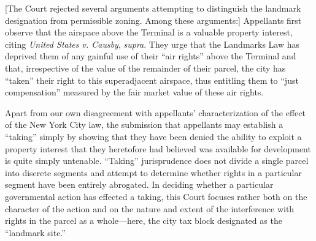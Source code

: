 
[The Court rejected several arguments attempting to distinguish the landmark
designation from permissible zoning. Among these arguments:]
Appellants
first observe that the airspace above the Terminal is a valuable property
interest, citing \textit{United States v. Causby}, \emph{supra}. They urge that
the Landmarks Law has deprived them of any gainful use of their ``air rights''
above the Terminal and that, irrespective of the value of the remainder of their
parcel, the city has ``taken'' their right to this superadjacent airspace, thus
entitling them to ``just compensation'' measured by the fair market value of
these air rights.

Apart from our own disagreement with appellants' characterization of the effect
of the New York City law, the submission that appellants may establish a
``taking'' simply by showing that they have been denied the ability to exploit a
property interest that they heretofore had believed was available for
development is quite simply untenable.
``Taking'' jurisprudence does not divide a single parcel into discrete
segments and attempt to determine whether rights in a particular segment have
been entirely abrogated. In deciding whether a particular governmental action
has effected a taking, this Court focuses rather both on the character of the
action and on the nature and extent of the interference with rights in the
parcel as a whole---here, the city tax block designated as the ``landmark
site.''

